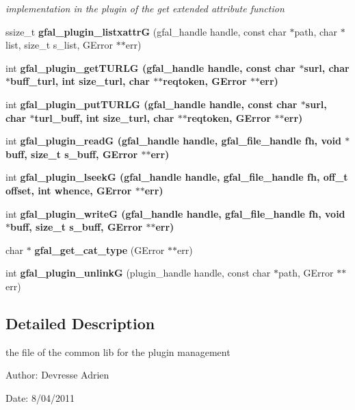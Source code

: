 \begin{CompactItemize}
\begin{CompactList}\small\item\em implementation in the plugin of the get extended attribute function \item\end{CompactList}\item 
ssize\_\-t \textbf{gfal\_\-plugin\_\-listxattr\-G} (gfal\_\-handle handle, const char $\ast$path, char $\ast$list, size\_\-t s\_\-list, GError $\ast$$\ast$err)\label{gfal__common__plugin_8c_ef696550c6ac4bab6dec58d7c857b3f4}

\item 
int \bf{gfal\_\-plugin\_\-get\-TURLG} (gfal\_\-handle handle, const char $\ast$surl, char $\ast$buff\_\-turl, int size\_\-turl, char $\ast$$\ast$reqtoken, GError $\ast$$\ast$err)
\item 
int \bf{gfal\_\-plugin\_\-put\-TURLG} (gfal\_\-handle handle, const char $\ast$surl, char $\ast$turl\_\-buff, int size\_\-turl, char $\ast$$\ast$reqtoken, GError $\ast$$\ast$err)
\item 
int \bf{gfal\_\-plugin\_\-read\-G} (gfal\_\-handle handle, gfal\_\-file\_\-handle fh, void $\ast$buff, size\_\-t s\_\-buff, GError $\ast$$\ast$err)
\item 
int \bf{gfal\_\-plugin\_\-lseek\-G} (gfal\_\-handle handle, gfal\_\-file\_\-handle fh, off\_\-t offset, int whence, GError $\ast$$\ast$err)
\item 
int \bf{gfal\_\-plugin\_\-write\-G} (gfal\_\-handle handle, gfal\_\-file\_\-handle fh, void $\ast$buff, size\_\-t s\_\-buff, GError $\ast$$\ast$err)
\item 
char $\ast$ \textbf{gfal\_\-get\_\-cat\_\-type} (GError $\ast$$\ast$err)\label{gfal__common__plugin_8c_c20aa1a376c802d0c60208854537851e}

\item 
int \textbf{gfal\_\-plugin\_\-unlink\-G} (plugin\_\-handle handle, const char $\ast$path, GError $\ast$$\ast$err)\label{gfal__common__plugin_8c_23ee550b9dd10a5561e6c9c233fb621f}

\end{CompactItemize}


\subsection{Detailed Description}
the file of the common lib for the plugin management 

\begin{Desc}
\item[Author:]Devresse Adrien \end{Desc}
\begin{Desc}
\item[Date:]8/04/2011 \end{Desc}



